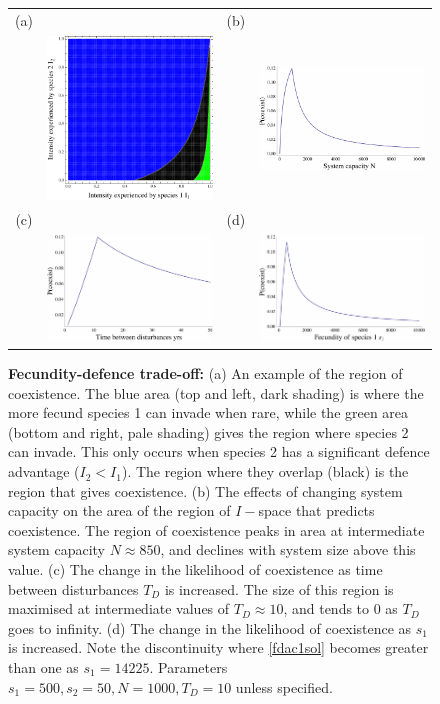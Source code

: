 \begin{figure}[htbp]
\begin{tabular}{cccc}
(a)&&(b)&\\
&\includegraphics[width=2in]{fdtoexample.pdf}&&\includegraphics[width=2in]{fdtointwN.pdf} \\
(c)&&(d)&\\
&\includegraphics[width=2in]{fdtointwTd.pdf}&&\includegraphics[width=2in]{fdtointws1.pdf}
\end{tabular}
\caption[Consequences of a fecundity-defence trade-off]{\textbf{Fecundity-defence trade-off:} (a) An example of the region of coexistence. The blue area (top and left, dark shading) is where the more fecund species 1 can invade when rare, while the green area (bottom and right, pale shading) gives the region where species 2 can invade. This only occurs when species 2 has a significant defence advantage ($I_2<I_1$). The region where they overlap (black) is the region that gives coexistence. (b) The effects of changing system capacity on the area of the region of $I-$space that predicts coexistence. The region of coexistence peaks in area at intermediate system capacity $N\approx 850$, and declines with system size above this value. (c) The change in the likelihood of coexistence as time between disturbances $T_D$ is increased. The size of this region is maximised at intermediate values of $T_D \approx 10$, and tends to 0 as $T_D$ goes to infinity. (d) The change in the likelihood of coexistence as $s_1$ is increased. Note the discontinuity where \eqref{fdac1sol} becomes greater than one as $s_1=14225$.  Parameters $s_1=500,s_2=50,N=1000,T_D=10$ unless specified.}
\label{fd}
\end{figure}

